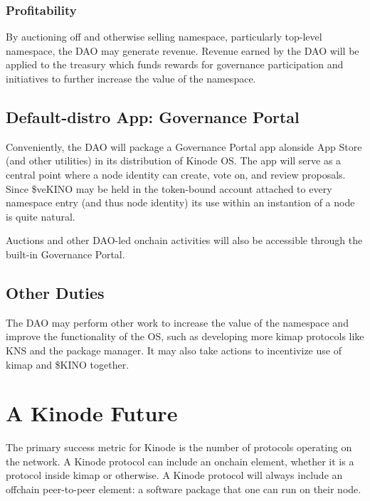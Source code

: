 \documentclass[runningheads]{llncs}
\begin{document}
\subsubsection{Profitability}
\label{sec:daoprofit}

By auctioning off and otherwise selling namespace, particularly top-level namespace, the DAO may generate revenue.
Revenue earned by the DAO will be applied to the treasury which funds rewards for governance participation and initiatives to further increase the value of the namespace.

\subsection{Default-distro App: Governance Portal}
\label{sec:daoportal}

Conveniently, the DAO will package a Governance Portal app alonside App Store (and other utilities) in its distribution of Kinode OS.
The app will serve as a central point where a node identity can create, vote on, and review proposals.
Since \$veKINO may be held in the token-bound account attached to every namespace entry (and thus node identity) its use within an instantion of a node is quite natural.

Auctions and other DAO-led onchain activities will also be accessible through the built-in Governance Portal.

\subsection{Other Duties}
\label{sec:daoduties}

The DAO may perform other work to increase the value of the namespace and improve the functionality of the OS, such as developing more kimap protocols like KNS and the package manager.
It may also take actions to incentivize use of kimap and \$KINO together.

\section{A Kinode Future}
\label{sec:future}

The primary success metric for Kinode is the number of protocols operating on the network.
A Kinode protocol can include an onchain element, whether it is a protocol inside kimap or otherwise.
A Kinode protocol will always include an offchain peer-to-peer element: a software package that one can run on their node.
\end{document}
